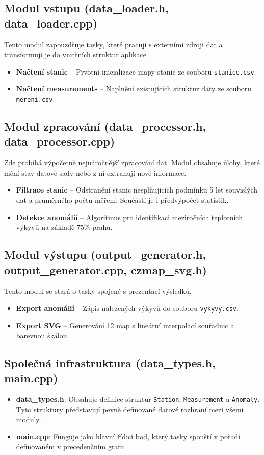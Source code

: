 \documentclass[10pt, a4paper]{report}
\begin{document}
	\subsection{Modul vstupu (data\_loader.h, data\_loader.cpp)}
	Tento modul zapouzdřuje tasky, které pracují s externími zdroji dat a transformují je do vnitřních struktur aplikace.
	\begin{itemize}
		\item \textbf{Načtení stanic} – Prvotní inicializace mapy stanic ze souboru \texttt{stanice.csv}.
		\item \textbf{Načtení measurements} – Naplnění existujících struktur daty ze souboru \texttt{mereni.csv}.
	\end{itemize}
	
	\subsection{Modul zpracování (data\_processor.h, data\_processor.cpp)}
	Zde probíhá výpočetně nejnáročnější zpracování dat. Modul obsahuje úlohy, které mění stav datové sady nebo z ní extrahují nové informace.
	\begin{itemize}
		\item \textbf{Filtrace stanic} – Odstranění stanic nesplňujících podmínku 5 let souvislých dat a průměrného počtu měření. Součástí je i předvýpočet statistik.
		\item \textbf{Detekce anomálií} – Algoritmus pro identifikaci meziročních teplotních výkyvů na základě 75\% prahu.
	\end{itemize}
	
	\subsection{Modul výstupu (output\_generator.h, output\_generator.cpp, czmap\_svg.h)}
	Tento modul se stará o tasky spojené s prezentací výsledků.
	\begin{itemize}
		\item \textbf{Export anomálií} – Zápis nalezených výkyvů do souboru \texttt{vykyvy.csv}.
		\item \textbf{Export SVG} – Generování 12 map s lineární interpolací souřadnic a barevnou škálou.
	\end{itemize}
	
	\subsection{Společná infrastruktura (data\_types.h, main.cpp)}
	\begin{itemize}
		\item \textbf{data\_types.h}: Obsahuje definice struktur \texttt{Station}, \texttt{Measurement} a \texttt{Anomaly}. Tyto struktury představují pevně definované datové rozhraní mezi všemi moduly.
		\item \textbf{main.cpp}: Funguje jako hlavní řídicí bod, který tasky spouští v pořadí definovaném v precedenčním grafu.
	\end{itemize}
	
\end{document}
